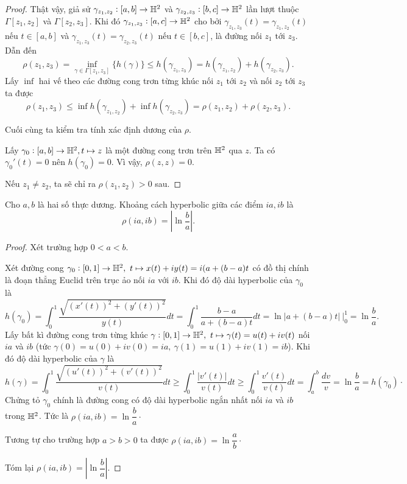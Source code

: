 \begin{proof}
    Thật vậy, giả sử $\gamma_{z_1,z_2}:[a,b]\to \mathbb{H}^2$ và $\gamma_{z_2,z_3}:[b,c]\to \mathbb{H}^2$ lần lượt thuộc $\Gamma[z_1,z_2]$ và $\Gamma[z_2,z_3]$. Khi đó $\gamma_{z_1,z_3}: [a,c] \to \mathbb{H}^2$ cho bởi $\gamma_{z_1,z_3}(t) = \gamma_{z_1,z_2}(t)$ nếu $t\in[a,b]$ và $\gamma_{z_1,z_3}(t) = \gamma_{z_2,z_3}(t)$ nếu $t\in[b,c]$, là đường nối $z_1 \text{ tới }z_3$. Dẫn đến
    \[\rho(z_1,z_3) = \inf_{\gamma \in \Gamma[z_1,z_3]}\{h(\gamma)\} \leq h(\gamma_{z_1,z_3}) = h(\gamma_{z_1,z_2}) + h(\gamma_{z_2,z_3}).\]
    Lấy $\inf$ hai vế theo các đường cong trơn từng khúc nối $z_1 \text{ tới }z_2$ và nối $z_2 \text{ tới }z_3$ ta được
    \[\rho(z_1,z_3) \leq  \inf h(\gamma_{z_1,z_2}) + \inf h(\gamma_{z_2,z_3}) = \rho(z_1,z_2) + \rho(z_2,z_3).\]

    Cuối cùng ta kiểm tra tính xác định dương của $\rho$.

    Lấy $\gamma_0: [a,b] \to \mathbb{H}^2, t \mapsto z$ là một đường cong trơn trên $\mathbb{H}^2$ qua $z$. Ta có $\gamma_0'(t) = 0$ nên $h(\gamma_0) = 0 $. Vì vậy, $\rho(z,z) = 0$.

    Nếu $z_1 \neq z_2$, ta sẽ chỉ ra $\rho(z_1,z_2) >0$ sau.
\end{proof}
\begin{prop}\label{prop 2.1.8}
    Cho $a,b$ là hai số thực dương. Khoảng cách hyperbolic giữa các điểm $ia, ib$ là 
    \[\rho(ia,ib) = \left|\ln{\dfrac{b}{a}}\right|.\]
\end{prop}
\begin{proof}
    Xét trường hợp $0<a<b$.
    
    Xét đường cong $\gamma_0:[0,1] \to \mathbb{H}^2,~t\mapsto x(t) + iy(t) = i(a+(b-a)t$ có đồ thị chính là đoạn thẳng Euclid trên trục ảo nối $ia$ với $ib$. Khi đó độ dài hyperbolic của $\gamma_0$ là 
    \[h(\gamma_0) = \int_{0}^{1}{\dfrac{\sqrt{(x'(t))^2+(y'(t))^2}}{y(t)}}dt = \int_{0}^{1}{\dfrac{b-a}{a+(b-a)t}}dt = \ln{|a+(b-a)t|~\bigg|_{0}^{1}} = \ln \dfrac{b}{a}.\]
    Lấy bất kì đường cong trơn từng khúc $\gamma: [0,1] \to \mathbb{H}^2,~t \mapsto \gamma(t) = u(t) + i v(t)$ nối $ia$ và $ib$ (tức $\gamma(0)=u(0)+iv(0)=ia,~\gamma(1)=u(1)+iv(1)=ib$). Khi đó độ dài hyperbolic của $\gamma$ là
    \[h(\gamma) = \int_{0}^{1}{\dfrac{\sqrt{(u'(t))^2+(v'(t))^2}}{v(t)}}dt \geq \int_{0}^{1}{\dfrac{|v'(t)|}{v(t)}}dt \geq \int_{0}^{1}{\dfrac{v'(t)}{v(t)}}dt = \int_{a}^{b}{\dfrac{dv}{v}} = \ln\dfrac{b}{a } = h(\gamma_0)\cdot\]
    Chửng tỏ $\gamma_0$ chính là đường cong có độ dài hyperbolic ngắn nhất nối $ia$ và $ib$ trong $\mathbb{H}^2$. Tức là $\rho(ia,ib) = \ln \dfrac{b}{a}\cdot$

    Tương tự cho trường hợp $a>b>0$ ta được $\rho(ia,ib) = \ln \dfrac{a}{b}\cdot$

    Tóm lại $\rho(ia,ib) = \left|\ln{\dfrac{b}{a}}\right|.$
\end{proof}
